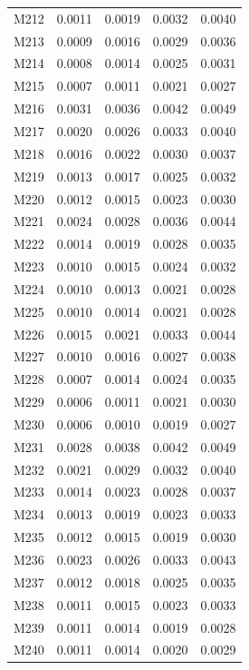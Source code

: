 \begin{longtable}{lrrrr}
M212 & 0.0011 & 0.0019 & 0.0032 & 0.0040 \\
M213 & 0.0009 & 0.0016 & 0.0029 & 0.0036 \\
M214 & 0.0008 & 0.0014 & 0.0025 & 0.0031 \\
M215 & 0.0007 & 0.0011 & 0.0021 & 0.0027 \\
M216 & 0.0031 & 0.0036 & 0.0042 & 0.0049 \\
M217 & 0.0020 & 0.0026 & 0.0033 & 0.0040 \\
M218 & 0.0016 & 0.0022 & 0.0030 & 0.0037 \\
M219 & 0.0013 & 0.0017 & 0.0025 & 0.0032 \\
M220 & 0.0012 & 0.0015 & 0.0023 & 0.0030 \\
M221 & 0.0024 & 0.0028 & 0.0036 & 0.0044 \\
M222 & 0.0014 & 0.0019 & 0.0028 & 0.0035 \\
M223 & 0.0010 & 0.0015 & 0.0024 & 0.0032 \\
M224 & 0.0010 & 0.0013 & 0.0021 & 0.0028 \\
M225 & 0.0010 & 0.0014 & 0.0021 & 0.0028 \\
M226 & 0.0015 & 0.0021 & 0.0033 & 0.0044 \\
M227 & 0.0010 & 0.0016 & 0.0027 & 0.0038 \\
M228 & 0.0007 & 0.0014 & 0.0024 & 0.0035 \\
M229 & 0.0006 & 0.0011 & 0.0021 & 0.0030 \\
M230 & 0.0006 & 0.0010 & 0.0019 & 0.0027 \\
M231 & 0.0028 & 0.0038 & 0.0042 & 0.0049 \\
M232 & 0.0021 & 0.0029 & 0.0032 & 0.0040 \\
M233 & 0.0014 & 0.0023 & 0.0028 & 0.0037 \\
M234 & 0.0013 & 0.0019 & 0.0023 & 0.0033 \\
M235 & 0.0012 & 0.0015 & 0.0019 & 0.0030 \\
M236 & 0.0023 & 0.0026 & 0.0033 & 0.0043 \\
M237 & 0.0012 & 0.0018 & 0.0025 & 0.0035 \\
M238 & 0.0011 & 0.0015 & 0.0023 & 0.0033 \\
M239 & 0.0011 & 0.0014 & 0.0019 & 0.0028 \\
M240 & 0.0011 & 0.0014 & 0.0020 & 0.0029 \\
\end{longtable}
